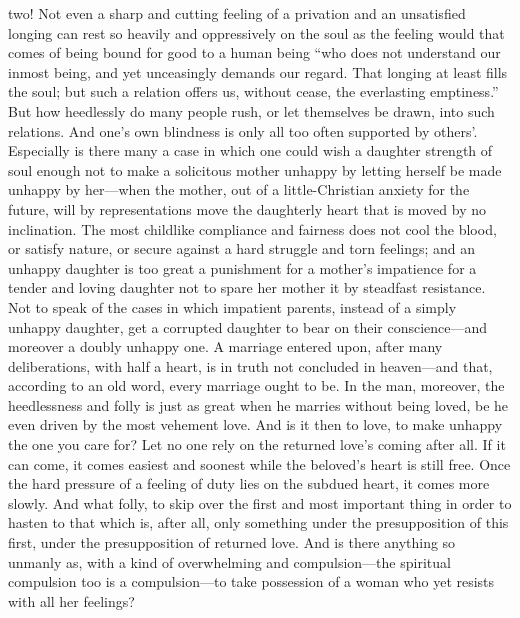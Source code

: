 \documentclass[12pt,a4paper]{book}
\begin{document}
two! Not even a sharp and cutting feeling of a privation and an unsatisfied
longing can rest so heavily and oppressively on the soul as the feeling
would that comes of being bound for good to a human being ``who does not
understand our inmost being, and yet unceasingly demands our regard. That
longing at least fills the soul; but such a relation offers us, without
cease, the everlasting emptiness.'' But how heedlessly do many people rush,
or let themselves be drawn, into such relations. And one's own blindness is
only all too often supported by others'. Especially is there many a case in
which one could wish a daughter strength of soul enough not to make a
solicitous mother unhappy by letting herself be made unhappy by
her---when the mother, out of a little-Christian anxiety for the future,
will by representations move the daughterly heart that is moved by no
inclination. The most childlike compliance and fairness does not cool the
blood, or satisfy nature, or secure against a hard struggle and torn
feelings; and an unhappy daughter is too great a punishment for a mother's
impatience for a tender and loving daughter not to spare her mother it by
steadfast resistance. Not to speak of the cases in which impatient parents,
instead of a simply unhappy daughter, get a corrupted daughter to bear on
their conscience---and moreover a doubly unhappy one. A marriage entered
upon, after many deliberations, with half a heart, is in truth not
concluded in heaven---and that, according to an old word, every marriage
ought to be. In the man, moreover, the heedlessness and folly is just as
great when he marries without being loved, be he even driven by the most
vehement love. And is it then to love, to make unhappy the one you care
for? Let no one rely on the returned love's coming after all. If it can
come, it comes easiest and soonest while the beloved's heart is still free.
Once the hard pressure of a feeling of duty lies on the subdued heart, it
comes more slowly. And what folly, to skip over the first and most
important thing in order to hasten to that which is, after all, only
something under the presupposition of this first, under the presupposition
of returned love. And is there anything so unmanly as, with a kind of
overwhelming and compulsion---the spiritual compulsion too is a
compulsion---to take possession of a woman who yet resists with all her
feelings?
\end{document}
